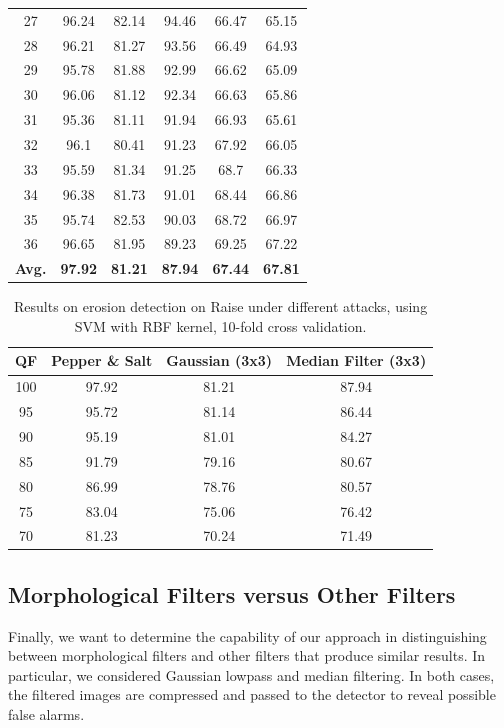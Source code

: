 \documentclass[review]{elsarticle}
\begin{document}
\begin{table}[!t]
{\begin{tabular}{c|ccccc}
		27&96.24&82.14&94.46&66.47&65.15\\
		28&96.21&81.27&93.56&66.49&64.93\\
		29&95.78&81.88&92.99&66.62&65.09\\
		30&96.06&81.12&92.34&66.63&65.86\\
		31&95.36&81.11&91.94&66.93&65.61\\
		32&96.1&80.41&91.23&67.92&66.05\\
		33&95.59&81.34&91.25&68.7&66.33\\
		34&96.38&81.73&91.01&68.44&66.86\\
		35&95.74&82.53&90.03&68.72&66.97\\
		36&96.65&81.95&89.23&69.25&67.22\\
		\hline
		\textbf{Avg.}&\textbf{97.92}&\textbf{81.21}&\textbf{87.94}&\textbf{67.44}&\textbf{67.81}\\
		\hline\hline	
	\end{tabular}}
\end{table}



\begin{table}[!t]
	\centering
	\caption{Results on erosion detection on Raise under different attacks, using SVM with RBF kernel, 10-fold cross validation.}
	\label{table:attacks2}
	\begin{tabular}{c|ccc}
		\hline\hline
		\textbf{QF} & \textbf{Pepper \& Salt}&\textbf{Gaussian (3x3)}&\textbf{Median Filter (3x3)}\\
		\hline
		100&97.92&81.21&87.94\\
		95&95.72&81.14&86.44\\
		90&95.19&81.01&84.27\\
		85&91.79&79.16&80.67\\
		80&86.99&78.76&80.57\\
		75&83.04&75.06&76.42\\
		70&81.23&70.24&71.49\\
		\hline\hline	
	\end{tabular}
\end{table}

\subsection{Morphological Filters versus Other Filters }
\label{subsec:results_different_filters}

Finally, we want to determine the capability of our approach in distinguishing between morphological filters and other filters that produce similar results. In particular, we considered Gaussian lowpass and median filtering. In both cases, the filtered images are compressed and passed to the detector to reveal possible false alarms.
\end{document}
